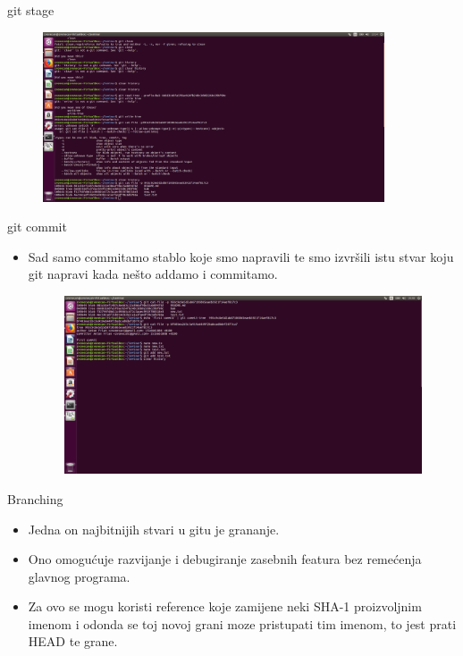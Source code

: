 \documentclass{beamer}
\begin{document}
\begin{frame}{git stage}
	\begin{figure}
		\centering
	\includegraphics[width=0.9\textwidth]{./slike/sesta_slika.png}
	\end{figure}


\end{frame}

\begin{frame}{git commit}

\begin{itemize}
	\item Sad samo commitamo stablo koje smo napravili te smo izvršili istu stvar koju git napravi kada nešto addamo i commitamo.
	\begin{figure}
		\centering
	\includegraphics[width=.8\textwidth]{./slike/sedma_slika.png}
	\end{figure}
\end{itemize}
\end{frame}

\begin{frame}{Branching}
	\begin{itemize}
	\item Jedna on najbitnijih stvari u gitu je grananje.
	\item Ono omogućuje razvijanje i debugiranje zasebnih featura bez remećenja glavnog programa. 
	\item Za ovo se mogu koristi reference koje zamijene neki SHA-1 proizvoljnim imenom i odonda se toj novoj grani moze pristupati tim imenom, to jest prati HEAD te grane.
	\end{itemize}
	
\end{frame}
\end{document}
